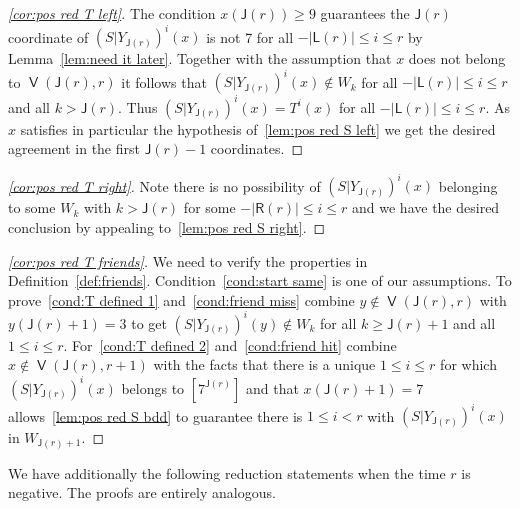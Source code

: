 \documentclass[AHL,Unicode,longabstracts,published]{cedram}
\DeclareMathOperator{\bad}{\mathsf{V}}
\newcommand{\lft}{\mathsf{L}}
\newcommand{\rht}{\mathsf{R}}
\newcommand{\scl}{\mathsf{J}}
\begin{document}
\begin{proofc}
\begin{proof}[{\eqref{cor:pos red T left}}]
The condition $x(\scl(r)) \ge 9$ guarantees the $\scl(r)$ coordinate of $(S|Y_{\scl(r)})^i(x)$ is not 7 for all $-|\lft(r)|
\le i\le r$ by Lemma~\ref{lem:need it later}. Together with the assumption that $x$ does not belong to $\bad(\scl(r),r)$ it follows that $(S|Y_{\scl(r)})^i(x) \notin W_k$ for all $-|\lft(r)| \le i \le r$ and all $k > \scl(r)$. Thus $(S|Y_{\scl(r)})^i(x) = T^i(x)$ for all $-|\lft(r)| \le i\le r$. As $x$ satisfies in particular the hypothesis of~\eqref{lem:pos red S left} we get the desired agreement in the first $\scl(r)-1$ coordinates.
\let\qed\relax
\end{proof}

\begin{proof}[{\eqref{cor:pos red T right}}]
Note there is no possibility of $(S|Y_{\scl(r)})^i(x)$ belonging to some $W_k$ with $k > \scl(r)$ for some $-|\rht(r)| \le i \le r$ and we have the desired conclusion by appealing to~\eqref{lem:pos red S right}.
\let\qed\relax
\end{proof}

\begin{proof}[{\eqref{cor:pos red T friends}}]
We need to verify the properties in Definition~\ref{def:friends}. Condition~\eqref{cond:start same} is one of our assumptions. To prove~\eqref{cond:T defined 1} and~\eqref{cond:friend miss} combine $y \not\in \bad(\scl(r),r)$ with $y(\scl(r) + 1) = 3$ to get $(S|Y_{\scl(r)})^i(y) \not\in W_k$ for all $k \ge \scl(r)+1$ and all $1 \le i
\le r$. For~\eqref{cond:T defined 2} and~\eqref{cond:friend hit} combine $x
\not\in \bad(\scl(r),r+1)$ with the facts that there is a unique $1 \le i \le r$ for which $(S|Y_{\scl(r)})^i(x)$ belongs to $[7^{\scl(r)}]$ and that $x(\scl(r) + 1) = 7$ allows~\eqref{lem:pos red S bdd} to guarantee there is $1
\le i < r$ with $(S|Y_{\scl(r)})^i(x)$ in $W_{\scl(r)+1}$.
\end{proof}\let\qed\relax
\end{proofc}

We have additionally the following reduction statements when the time $r$ is negative. The proofs are entirely analogous.
\end{document}
